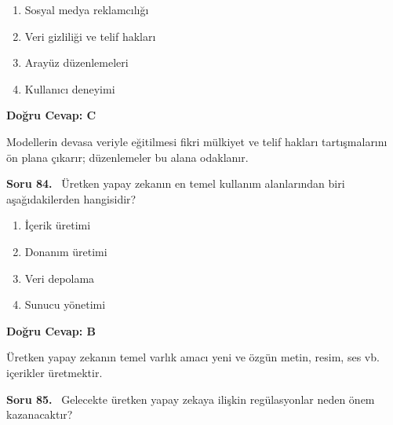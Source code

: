 \documentclass[11pt,a4paper,openany]{book}
\begin{document}
\begin{enumerate}[label=\Alph*), leftmargin=25pt, topsep=4pt, itemsep=2pt]
        \item Sosyal medya reklamcılığı
        \item Veri gizliliği ve telif hakları
        \item Arayüz düzenlemeleri
        \item Kullanıcı deneyimi
\end{enumerate}

\vspace{4pt}
\begin{tcolorbox}[title=Cevap ve Açıklama, colback=gray!3!white, colframe=primarycolor!90!black, arc=2mm, fonttitle=\bfseries\sffamily, top=6pt, bottom=6pt]
    \textbf{Doğru Cevap: C}

    \vspace{2pt}
    Modellerin devasa veriyle eğitilmesi fikri mülkiyet ve telif hakları tartışmalarını ön plana çıkarır; düzenlemeler bu alana odaklanır.
\end{tcolorbox}
\vspace{10pt}
\needspace{5cm}
\vspace{8pt}
\noindent\textbf{\large\sffamily Soru 84.} \ Üretken yapay zekanın en temel kullanım alanlarından biri aşağıdakilerden hangisidir?

\begin{enumerate}[label=\Alph*), leftmargin=25pt, topsep=4pt, itemsep=2pt]
        \item İçerik üretimi
        \item Donanım üretimi
        \item Veri depolama
        \item Sunucu yönetimi
\end{enumerate}

\vspace{4pt}
\begin{tcolorbox}[title=Cevap ve Açıklama, colback=gray!3!white, colframe=primarycolor!90!black, arc=2mm, fonttitle=\bfseries\sffamily, top=6pt, bottom=6pt]
    \textbf{Doğru Cevap: B}

    \vspace{2pt}
    Üretken yapay zekanın temel varlık amacı yeni ve özgün metin, resim, ses vb. içerikler üretmektir.
\end{tcolorbox}
\vspace{10pt}
\needspace{5cm}
\vspace{8pt}
\noindent\textbf{\large\sffamily Soru 85.} \ Gelecekte üretken yapay zekaya ilişkin regülasyonlar neden önem kazanacaktır?
\end{document}
